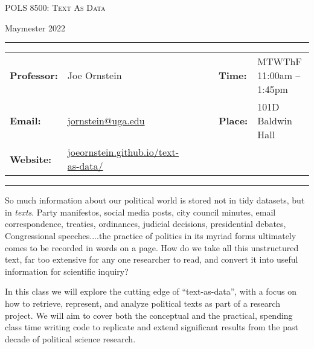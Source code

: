 \documentclass[11pt, letterpaper]{article}
\begin{document}
\begin{center}
{\Large \textsc{POLS 8500: Text As Data}}
\end{center}
\begin{center}
{\large Maymester 2022}
\end{center}

\begin{center}
\rule{6.5in}{0.4pt}
\begin{minipage}[t]{.96\textwidth}
\begin{tabular}{llcccll}
\textbf{Professor:} & Joe Ornstein & & &  & \textbf{Time:} & MTWThF 11:00am -- 1:45pm \\
\textbf{Email:} &  \href{mailto:jornstein@uga.edu}{jornstein@uga.edu} & & & & \textbf{Place:} & 101D Baldwin Hall\\
\textbf{Website:} & \href{https://joeornstein.github.io/text-as-data/}{joeornstein.github.io/text-as-data/} & & & & &
\end{tabular}
\end{minipage}
\rule{6.5in}{0.4pt}
\end{center}
\vspace{.15cm}
\setlength{\unitlength}{1in}
\renewcommand{\arraystretch}{2}


\noindent So much information about our political world is stored not in tidy datasets, but in \textit{texts}. Party manifestos, social media posts, city council minutes, email correspondence, treaties, ordinances, judicial decisions, presidential debates, Congressional speeches....the practice of politics in its myriad forms ultimately comes to be recorded in words on a page. How do we take all this unstructured text, far too extensive for any one researcher to read, and convert it into useful information for scientific inquiry?

In this class we will explore the cutting edge of ``text-as-data'', with a focus on how to retrieve, represent, and analyze political texts as part of a research project. We will aim to cover both the conceptual and the practical, spending class time writing code to replicate and extend significant results from the past decade of political science research. 


\end{document}
